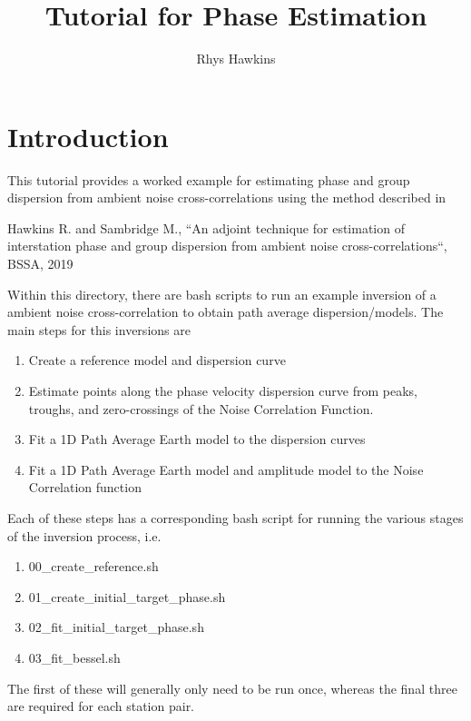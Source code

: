 \documentclass{article}
\begin{document}
\title{Tutorial for Phase Estimation}
\author{Rhys Hawkins}
\maketitle

\section{Introduction}

This tutorial provides a worked example for estimating phase and group dispersion
from ambient noise cross-correlations using the method described in

\begin{flushleft}
  Hawkins R. and Sambridge M., ``An adjoint technique for estimation of interstation phase and
  group dispersion from ambient noise cross-correlations``, BSSA, 2019
\end{flushleft}

Within this directory, there are bash scripts to run an example inversion of a ambient noise
cross-correlation to obtain path average dispersion/models. The main steps for this inversions
are

\begin{enumerate}
\item Create a reference model and dispersion curve
\item Estimate points along the phase velocity dispersion curve from peaks, troughs, and zero-crossings
  of the Noise Correlation Function.
\item Fit a 1D Path Average Earth model to the dispersion curves
\item Fit a 1D Path Average Earth model and amplitude model to the Noise Correlation function
\end{enumerate}

Each of these steps has a corresponding bash script for running the various stages of
the inversion process, i.e.

\begin{enumerate}
\item 00\_create\_reference.sh
\item 01\_create\_initial\_target\_phase.sh
\item 02\_fit\_initial\_target\_phase.sh
\item 03\_fit\_bessel.sh
\end{enumerate}

The first of these will generally only need to be run once, whereas the final three
are required for each station pair.
\end{document}
